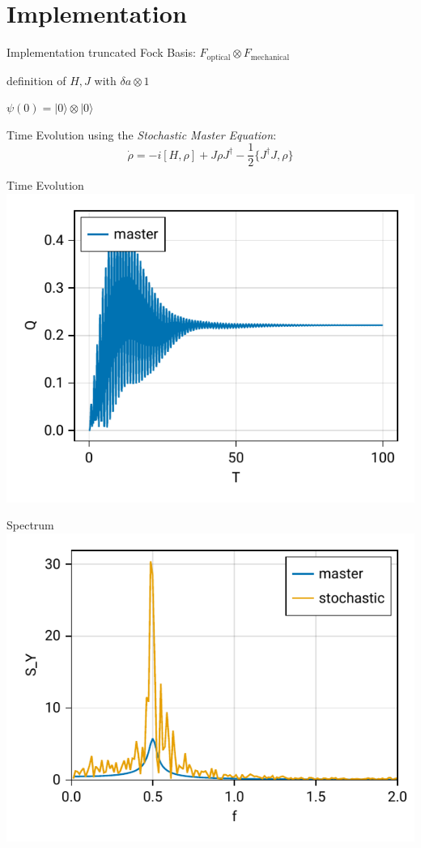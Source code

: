 \documentclass{beamer}
\begin{document}
\section{Implementation}
\begin{frame}{Implementation}
truncated Fock Basis: $F_\text{optical} \otimes F_\text{mechanical}$

definition of $H, J$ with $\delta a \otimes 1$

$\psi(0) = |0\rangle \otimes |0\rangle$

Time Evolution using the \emph{Stochastic Master Equation}: 
$$
	\dot\rho = -i[H,\rho] + J\rho J^\dagger - \frac{1}{2} \{J^\dagger J, \rho\}
$$
\end{frame}

\begin{frame}{Time Evolution}
	\centering
	\includegraphics{figures/01 time evolution.pdf}
\end{frame}

\begin{frame}{Spectrum}
	\centering
	\includegraphics{figures/01 time evolution spectrum.pdf}
\end{frame}
\end{document}
